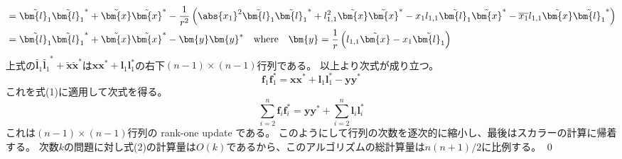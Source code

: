 \begin{derivation*}
\begin{align*}
                &= \tilde{\bm{l}_1}\tilde{\bm{l}_1}^* + \tilde{\bm{x}}\tilde{\bm{x}}^* - \frac{1}{r^2}\left(\abs{x_1}^2\tilde{\bm{l}_1}\tilde{\bm{l}_1}^* + l_{1,1}^2\tilde{\bm{x}}\tilde{\bm{x}}^* - x_1l_{1,1}\tilde{\bm{l}_1}\tilde{\bm{x}}^* - \overline{x_1}l_{1,1}\tilde{\bm{x}}\tilde{\bm{l}_1}^*\right) \\
                &= \tilde{\bm{l}_1}\tilde{\bm{l}_1}^* + \tilde{\bm{x}}\tilde{\bm{x}}^* - \bm{y}\bm{y}^* \quad \text{where} \quad \bm{y} = \frac{1}{r}\left(l_{1,1}\tilde{\bm{x}} - x_1\tilde{\bm{l}_1}\right)
            \end{align*}
            上式の$\tilde{\bm{l}_1}\tilde{\bm{l}_1}^* + \tilde{\bm{x}}\tilde{\bm{x}}^*$は$\bm{x}\bm{x}^* + \bm{l}_1\bm{l}_1^*$の右下$(n-1)\times(n-1)$行列である。
            以上より次式が成り立つ。
            \[ \bm{f}_1\bm{f}_1^* = \bm{x}\bm{x}^* + \bm{l}_1\bm{l}_1^* - \bm{y}\bm{y}^* \]
            これを式(1)に適用して次式を得る。
            \[ \sum_{i=2}^n \bm{f}_i\bm{f}_i^* = \bm{y}\bm{y}^* + \sum_{i=2}^n \bm{l}_i\bm{l}_i^* \]
            これは$(n-1)\times(n-1)$行列の rank-one update である。
            このようにして行列の次数を逐次的に縮小し、最後はスカラーの計算に帰着する。
            次数$k$の問題に対し式(2)の計算量は$O(k)$であるから、このアルゴリズムの総計算量は$n(n+1)/2$に比例する。
            \qed
        \end{derivation*}
